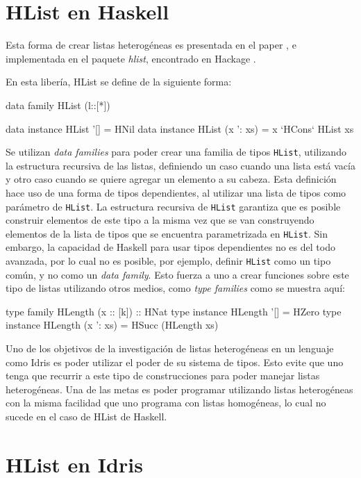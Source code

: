 \section{HList en Haskell}

Esta forma de crear listas heterogéneas es presentada en el paper \citet{Kiselyov:2004:STH:1017472.1017488}, e implementada en el paquete \textit{hlist}, encontrado en Hackage \cite{HListHackage}.

En esta libería, HList se define de la siguiente forma:

\begin{code}
data family HList (l::[*])

data instance HList '[] = HNil
data instance HList (x ': xs) = x `HCons` HList xs
\end{code}

Se utilizan \textit{data families} para poder crear una familia de tipos \texttt{HList}, utilizando la estructura recursiva de las listas, definiendo un caso cuando una lista está vacía y otro caso cuando se quiere agregar un elemento a su cabeza.
Esta definición hace uso de una forma de tipos dependientes, al utilizar una lista de tipos como parámetro de \texttt{HList}. La estructura recursiva de \texttt{HList} garantiza que es posible construir elementos de este tipo a la misma vez que se van construyendo elementos de la lista de tipos que se encuentra parametrizada en \texttt{HList}.
Sin embargo, la capacidad de Haskell para usar tipos dependientes no es del todo avanzada, por lo cual no es posible, por ejemplo, definir \texttt{HList} como un tipo común, y no como un \textit{data family}. Esto fuerza a uno a crear funciones sobre este tipo de listas utilizando otros medios, como \textit{type families} como se muestra aquí:

\begin{code}
type family HLength (x :: [k]) :: HNat
type instance HLength '[] = HZero
type instance HLength (x ': xs) = HSucc (HLength xs)
\end{code}

Uno de los objetivos de la investigación de listas heterogéneas en un lenguaje como Idris es poder utilizar el poder de su sistema de tipos. Esto evite que uno tenga que recurrir a este tipo de construcciones para poder manejar listas heterogéneas. Una de las metas es poder programar utilizando listas heterogéneas con la misma facilidad que uno programa con listas homogéneas, lo cual no sucede en el caso de HList de Haskell.

\section{HList en Idris}

